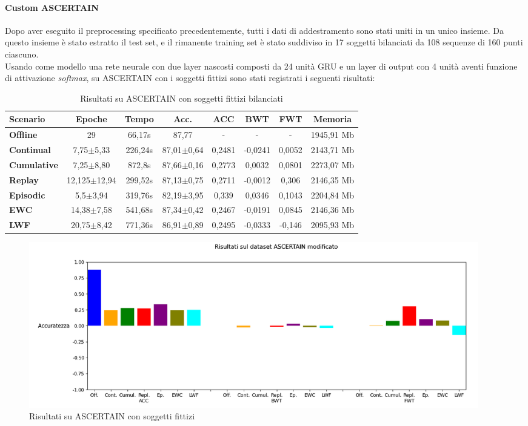 \paragraph{Custom ASCERTAIN} Dopo aver eseguito il preprocessing specificato precedentemente, tutti i dati di addestramento sono stati uniti in un unico insieme. Da questo insieme è stato estratto il test set, e il rimanente training set è stato suddiviso in 17 soggetti bilanciati da 108 sequenze di 160 punti ciascuno.\\
Usando come modello una rete neurale con due layer nascosti composti da 24 unità GRU e un layer di output con 4 unità aventi funzione di attivazione \textit{softmax}, su ASCERTAIN con i soggetti fittizi sono stati registrati i seguenti risultati:
\begin{table}[h]
\footnotesize
    \begin{tabular}{l|c|c|c|c|c|c|c}
        \textbf{Scenario} & \textbf{Epoche} & \textbf{Tempo} & \textbf{Acc.} & \textbf{ACC} & \textbf{BWT} & \textbf{FWT} & \textbf{Memoria}\\
        \hline
         \textbf{Offline} & 29 & 66,17s & 87,77 & - & - & - & 1945,91 Mb\\
        \textbf{Continual} & 7,75$\pm$5,33 & 226,24s & 87,01$\pm$0,64 & 0,2481 & -0,0241 & 0,0052 & 2143,71 Mb\\
        \textbf{Cumulative} & 7,25$\pm$8,80 & 872,8s & 87,66$\pm$0,16 & 0,2773 & 0,0032 & 0,0801 & 2273,07 Mb\\
        \textbf{Replay} & 12,125$\pm$12,94 & 299,52s & 87,13$\pm$0,75 & 0,2711 & -0,0012 & 0,306 & 2146,35 Mb\\
        \textbf{Episodic} & 5,5$\pm$3,94 & 319,76s & 82,19$\pm$3,95 & 0,339 & 0,0346 & 0,1043 & 2204,84 Mb\\
        \textbf{EWC} & 14,38$\pm$7,58 & 541,68s & 87,34$\pm$0,42 & 0,2467 & -0,0191 & 0,0845 & 2146,36 Mb\\
        \textbf{LWF} & 20,75$\pm$8,42 & 771,36s & 86,91$\pm$0,89 & 0,2495 & -0,0333 & -0,146 & 2095,93 Mb\\
    \end{tabular}
    \caption{Risultati su ASCERTAIN con soggetti fittizi bilanciati}
    \label{tab:rescustomascertain}
\end{table}
\begin{figure}[h]
	\begin{center}
		\includegraphics[width=0.95\textwidth]{img/graphs/customascertain_final_metrics.png}
		\caption{Risultati su ASCERTAIN con soggetti fittizi}
		\label{fig:customascertain_metrics_graph}
	\end{center}
\end{figure}

